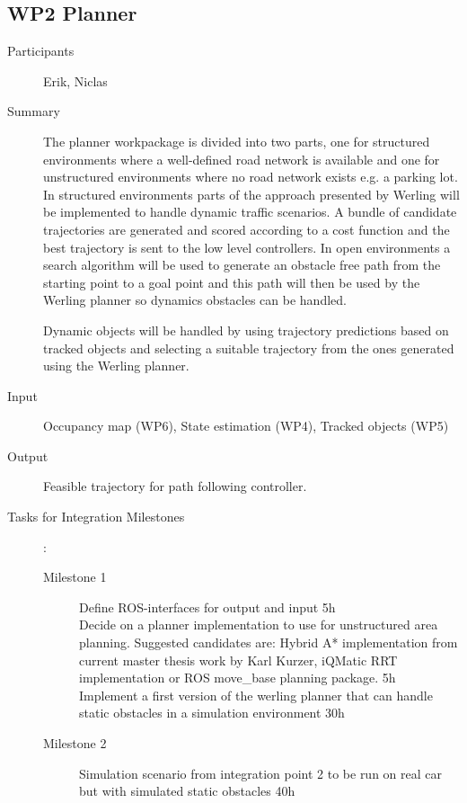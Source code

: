 \documentclass[11pt,a4paper]{article}
\begin{document}
\subsection{WP2 Planner}

\begin{description}
\item[Participants] Erik, Niclas
\item[Summary] The planner workpackage is divided into two parts, one
  for structured environments where a well-defined road network is
  available and one for unstructured environments where no road
  network exists e.g. a parking lot. In structured environments parts
  of the approach presented by Werling \cite{werling2011optimal} will be implemented to
  handle dynamic traffic scenarios. A bundle of candidate trajectories
  are generated and scored according to a cost function and the best
  trajectory is sent to the low level controllers. In open
  environments a search algorithm will be used to generate an obstacle
  free path from the starting point to a goal point and this path will
  then be used by the Werling planner so dynamics obstacles can be
  handled.

  Dynamic objects will be handled by using trajectory predictions based 
  on tracked objects and selecting a suitable trajectory from the ones
  generated using the Werling planner.
  
\item[Input] Occupancy map (WP6), State estimation (WP4), Tracked objects (WP5)
\item[Output] Feasible trajectory for path following controller.
\item[Tasks for Integration Milestones]:\
	\begin{description}
		\item[Milestone 1]  Define ROS-interfaces for output
                  and input 5h \\
                  
                  Decide on a planner implementation to
                  use for unstructured area planning. Suggested
                  candidates are: Hybrid A* \cite{dolgov2010path} implementation from
                  current master thesis work by Karl Kurzer, iQMatic
                  RRT implementation or ROS move\_base planning
                  package. 5h  \\
                  
                  Implement a first version of the werling
                  planner that can handle static obstacles in a
                  simulation environment 30h
		\item[Milestone 2] 
		Simulation scenario from integration
                  point 2 to be run on real car but with simulated
                  static obstacles 40h \\
                  

\end{description}
\end{description}
\end{document}
